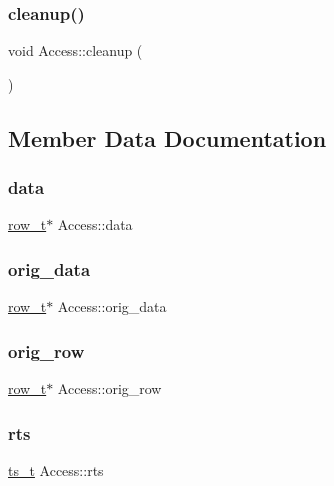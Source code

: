 \subsubsection{\texorpdfstring{cleanup()}{cleanup()}}
{\footnotesize\ttfamily void Access\+::cleanup (\begin{DoxyParamCaption}{ }\end{DoxyParamCaption})}



\subsection{Member Data Documentation}
\mbox{\label{classAccess_a9132c4f38f68e8e30ae16aa31ad6efbd}} 
\subsubsection{\texorpdfstring{data}{data}}
{\footnotesize\ttfamily \hyperlink{classrow__t}{row\+\_\+t}$\ast$ Access\+::data}

\mbox{\label{classAccess_ac0326631f064283f604ee204a59d4e66}} 
\subsubsection{\texorpdfstring{orig\+\_\+data}{orig\_data}}
{\footnotesize\ttfamily \hyperlink{classrow__t}{row\+\_\+t}$\ast$ Access\+::orig\+\_\+data}

\mbox{\label{classAccess_a171239dc1d26b94e1ec63683f1e7f195}} 
\subsubsection{\texorpdfstring{orig\+\_\+row}{orig\_row}}
{\footnotesize\ttfamily \hyperlink{classrow__t}{row\+\_\+t}$\ast$ Access\+::orig\+\_\+row}

\mbox{\label{classAccess_ab90bf7056cd6ca4c3d46ac6bcae26357}} 
\subsubsection{\texorpdfstring{rts}{rts}}
{\footnotesize\ttfamily \hyperlink{global_8h_aaf095dfc9b10f757c968fe146ad7e724}{ts\+\_\+t} Access\+::rts}

